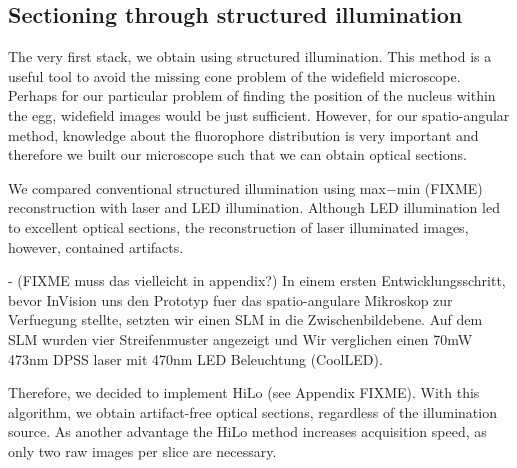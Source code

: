 \subsection{Sectioning through structured illumination}
The very first stack, we obtain using structured illumination.  This
method is a useful tool to avoid the missing cone problem of the
widefield microscope. Perhaps for our particular problem of finding
the position of the nucleus within the egg, widefield images would be
just sufficient.  However, for our spatio-angular method, knowledge
about the fluorophore distribution is very important and therefore we
built our microscope such that we can obtain optical sections.

We compared conventional structured illumination using max$-$min
(FIXME) reconstruction with laser and LED illumination. Although LED
illumination led to excellent optical sections, the reconstruction of
laser illuminated images, however, contained artifacts.

{\color{red}
- (FIXME muss das vielleicht in appendix?) In einem ersten
Entwicklungsschritt, bevor InVision uns den Prototyp fuer das
spatio-angulare Mikroskop zur Verfuegung stellte, setzten wir einen
SLM in die Zwischenbildebene. Auf dem SLM wurden vier Streifenmuster
angezeigt und Wir verglichen einen 70mW 473nm DPSS laser mit 470nm LED
Beleuchtung (CoolLED).}

Therefore, we decided to implement HiLo (see Appendix FIXME). With
this algorithm, we obtain artifact-free optical sections, regardless
of the illumination source. As another advantage the HiLo method
increases acquisition speed, as only two raw images per slice are
necessary.


